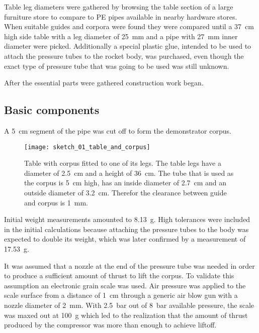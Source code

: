 Table leg diameters were gathered by browsing the table section of a large furniture store to compare to PE pipes available in nearby hardware stores. When suitable guides and corpora were found they were compared until a \SI{37}{\centi\meter} high side table \cite{table} with a leg diameter of \SI{25}{\milli\meter} and a pipe with \SI{27}{\milli\meter} inner diameter were picked. Additionally a special plastic glue, intended to be used to attach the pressure tubes to the rocket body, was purchased, even though the exact type of pressure tube that was going to be used was still unknown.

After the essential parts were gathered construction work began. 

\subsection{Basic components}
A \SI{5}{\centi\meter} segment of the pipe was cut off to form the demonstrator corpus.

\begin{figure}[h]
\centering

\texttt{[image: sketch\_01\_table\_and\_corpus]}

\caption{Table with corpus fitted to one of its legs. The table legs have a diameter of \SI{2,5}{\centi\meter} and a height of \SI{36}{\centi\meter}. The tube that is used as the corpus is \SI{5}{\centi\meter} high, has an inside diameter of \SI{2,7}{\centi\meter} and an outside diameter of \SI{3,2}{\centi\meter}. Therefor the clearance between guide and corpus is \SI{1}{\milli\meter}.}
\end{figure}


Initial weight measurements amounted to \SI{8,13}{\gram}. High tolerances were included in the initial calculations because attaching the pressure tubes to the body was expected to double its weight, which was later confirmed by a measurement of \SI{17,53}{\gram}.

It was assumed that a nozzle at the end of the pressure tube was needed in order to produce a sufficient amount of thrust to lift the corpus.
To validate this assumption an electronic grain scale was used. Air pressure was applied to the scale surface from a distance of \SI{1}{\centi\meter} through a generic air blow gun with a nozzle diameter of \SI{2}{\milli\meter}. With \SI{2,5}{\bar} out of \SI{8}{\bar} available pressure, the scale was maxed out at \SI{100}{\gram} which led to the realization that the amount of thrust produced by the compressor was more than enough to achieve liftoff. 


